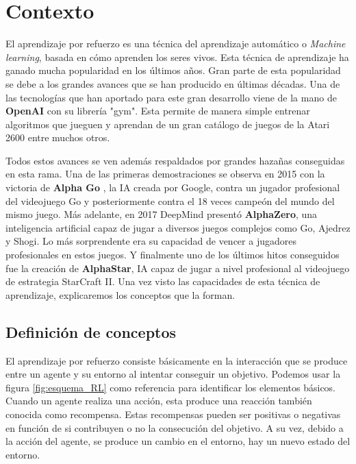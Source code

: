 \chapter{Contexto}

El aprendizaje por refuerzo es una técnica del aprendizaje automático o \emph{Machine learning}, basada en cómo aprenden los seres vivos. Esta técnica de aprendizaje ha ganado mucha popularidad en los últimos años. Gran parte de esta popularidad se debe a los grandes avances que se han producido en últimas décadas. Una de las tecnologías que han aportado para este gran desarrollo viene de la mano de \textbf{OpenAI} \cite {openia} con su librería "gym". Esta permite de manera simple entrenar algoritmos que jueguen y aprendan de un gran catálogo de juegos de la Atari 2600 entre muchos otros. 

Todos estos avances se ven además respaldados por grandes hazañas conseguidas en esta rama. Una de las primeras demostraciones se observa en 2015 con la victoria de \textbf{Alpha Go} \cite {alphago}, la IA creada por Google, contra un jugador profesional del videojuego Go y posteriormente contra el 18 veces campeón del mundo del mismo juego. Más adelante, en 2017 DeepMind \cite {deepmind} presentó \textbf{AlphaZero}, una inteligencia artificial capaz de jugar a diversos juegos complejos como Go, Ajedrez y Shogi. Lo más sorprendente era su capacidad de vencer a jugadores profesionales en estos juegos. Y finalmente uno de los últimos hitos conseguidos fue la creación de \textbf{AlphaStar}, IA capaz de jugar a nivel profesional al videojuego de estrategia StarCraft II. Una vez visto las capacidades de esta técnica de aprendizaje, explicaremos los conceptos que la forman.

\section{Definición de conceptos}

El aprendizaje por refuerzo consiste básicamente en la interacción que se produce entre un agente y su entorno al intentar conseguir un objetivo. Podemos usar la figura \ref {fig:esquema_RL} como referencia para identificar los elementos básicos. Cuando un agente realiza una acción, esta produce una reacción también conocida como recompensa. Estas recompensas pueden ser positivas o negativas en función de si contribuyen o no la consecución del objetivo. A su vez, debido a la acción del agente, se produce un cambio en el entorno, hay un nuevo estado del entorno.

